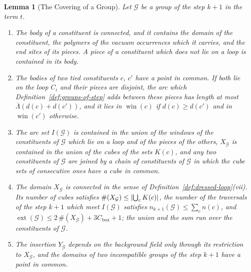\documentclass[11pt]{preprint}
\DeclarePairedDelimiter{\abs}{\lvert}{\rvert}
\numberwithin{equation}{section}
\newtheorem{lemma}[theorem]{Lemma}
\theoremstyle{definition}
\theoremstyle{remark}
\theoremstyle{plain}
\begin{document}
\begin{lemma}[The Covering of a Group]\label{lem:group-covering}
Let $\mathcal G$ be a group of the step $k + 1$ in the term $t$.
\begin{enumerate}[label=(\roman*)]
\item The body of a constituent is connected, and it contains the domain of the constituent, the polymers of the vacuum occurrences which it carries, and the end sites of its pieces. A piece of a constituent which does not lie on a loop is contained in its body.
\item The bodies of two tied constituents $c$, $c'$ have a point in common. If both lie on the loop $C_i$ and their pieces are disjoint, the arc which Definition~\ref{def:groups-of-step} adds between these pieces has length at most $\bar\Lambda(d(c) + d(c'))$, and it lies in $\operatorname{win}(c)$ if $d(c) \geq d(c')$ and in $\operatorname{win}(c')$ otherwise.
\item The arc set $I(\mathcal G)$ is contained in the union of the windows of the constituents of $\mathcal G$ which lie on a loop and of the pieces of the others, $X_{\mathcal G}$ is contained in the union of the cubes of the sets $K(c)$, and any two constituents of $\mathcal G$ are joined by a chain of constituents of $\mathcal G$ in which the cube sets of consecutive ones have a cube in common.
\item The domain $X_{\mathcal G}$ is connected in the sense of Definition~\ref{def:dressed-loop}(vii). Its number of cubes satisfies $\#(X_{\mathcal G}) \leq \abs{\bigcup_cK(c)}$, the number of the traversals of the step $k + 1$ which meet $I(\mathcal G)$ satisfies $n_{k+1}(\mathcal G) \leq \sum_cn(c)$, and $\operatorname{ext}(\mathcal G) \leq 2\,\#(X_{\mathcal G}) + 3C_{\mathrm{box}} + 1$; the union and the sum run over the constituents of $\mathcal G$.
\item The insertion $Y_{\mathcal G}$ depends on the background field only through its restriction to $X_{\mathcal G}$, and the domains of two incompatible groups of the step $k + 1$ have a point in common.
\end{enumerate}
\end{lemma}
\end{document}
